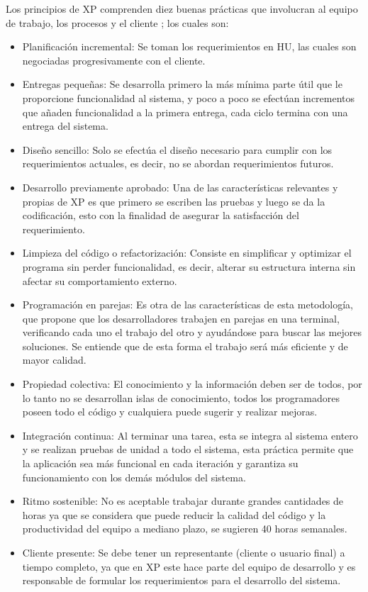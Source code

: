 {    Los principios de \ac{XP} comprenden diez buenas prácticas que involucran al equipo de trabajo, los procesos y el cliente \citep{pressman2014se}; los cuales son:
    \begin{itemize}
    	\item Planificación incremental: Se toman los requerimientos en \ac{HU}, las cuales son negociadas progresivamente con el cliente.
    	\item Entregas pequeñas: Se desarrolla primero la más mínima parte útil que le proporcione funcionalidad al sistema, y poco a poco se efectúan incrementos que añaden funcionalidad a la primera entrega, cada ciclo termina con una entrega del sistema.
    	\item Diseño sencillo: Solo se efectúa el diseño necesario para cumplir con los requerimientos actuales, es decir, no se abordan requerimientos futuros.
    	\item Desarrollo previamente aprobado: Una de las características relevantes y propias de \ac{XP} es que primero se escriben las pruebas y luego se da la codificación, esto con la finalidad de asegurar la satisfacción del requerimiento.
    	\item Limpieza del código o refactorización: Consiste en simplificar y optimizar el programa sin perder funcionalidad, es decir, alterar su estructura interna sin afectar su comportamiento externo.
    	\item Programación en parejas: Es otra de las características de esta metodología, que propone que los desarrolladores trabajen en parejas en una terminal, verificando cada uno el trabajo del otro y ayudándose para buscar las mejores soluciones. Se entiende que de esta forma el trabajo será más eficiente y de mayor calidad.
    	\item Propiedad colectiva: El conocimiento y la información deben ser de todos, por lo tanto no se desarrollan islas de conocimiento, todos los programadores poseen todo el código y cualquiera puede sugerir y realizar mejoras.
    	\item Integración continua: Al terminar una tarea, esta se integra al sistema entero y se realizan pruebas de unidad a todo el sistema, esta práctica permite que la aplicación sea más funcional en cada iteración y garantiza su funcionamiento con los demás módulos del sistema.
    	\item Ritmo sostenible: No es aceptable trabajar durante grandes cantidades de horas ya que se considera que puede reducir la calidad del código y la productividad del equipo a mediano plazo, se sugieren 40 horas semanales.
    	\item Cliente presente: Se debe tener un representante (cliente o usuario final) a tiempo completo, ya que en \ac{XP} este hace parte del equipo de desarrollo y es responsable de formular los requerimientos para el desarrollo del sistema.
    \end{itemize}
    
}
